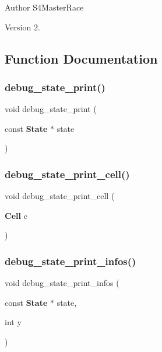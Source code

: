 \begin{DoxyAuthor}{Author}
S4\+Master\+Race 
\end{DoxyAuthor}
\begin{DoxyVersion}{Version}
2. 
\end{DoxyVersion}


\subsection{Function Documentation}
\mbox{\label{debug__state_8c_a9c0699f48870100dee7ceaa45763dd16}} 
\subsubsection{debug\+\_\+state\+\_\+print()}
{\footnotesize\ttfamily void debug\+\_\+state\+\_\+print (\begin{DoxyParamCaption}\item[{const \textbf{ State} $\ast$}]{state }\end{DoxyParamCaption})}

\mbox{\label{debug__state_8c_a57bffc683e10d64829dfaee65aa44c99}} 
\subsubsection{debug\+\_\+state\+\_\+print\+\_\+cell()}
{\footnotesize\ttfamily void debug\+\_\+state\+\_\+print\+\_\+cell (\begin{DoxyParamCaption}\item[{\textbf{ Cell}}]{c }\end{DoxyParamCaption})}

\mbox{\label{debug__state_8c_aa72d3737296f3a5b97a6589dc5cd8a92}} 
\subsubsection{debug\+\_\+state\+\_\+print\+\_\+infos()}
{\footnotesize\ttfamily void debug\+\_\+state\+\_\+print\+\_\+infos (\begin{DoxyParamCaption}\item[{const \textbf{ State} $\ast$}]{state,  }\item[{int}]{y }\end{DoxyParamCaption})}

